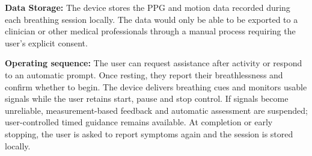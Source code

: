 \noindent\textbf{Data Storage:} The device stores the PPG and motion data recorded during each breathing session locally. The data would only be able to be exported to a clinician or other medical professionals through a manual process requiring the user's explicit consent.

\noindent\textbf{Operating sequence:} The user can request assistance after activity or respond to an automatic prompt. Once resting, they report their breathlessness and confirm whether to begin. The device delivers breathing cues and monitors usable signals while the user retains start, pause and stop control. If signals become unreliable, measurement-based feedback and automatic assessment are suspended; user-controlled timed guidance remains available. At completion or early stopping, the user is asked to report symptoms again and the session is stored locally.
